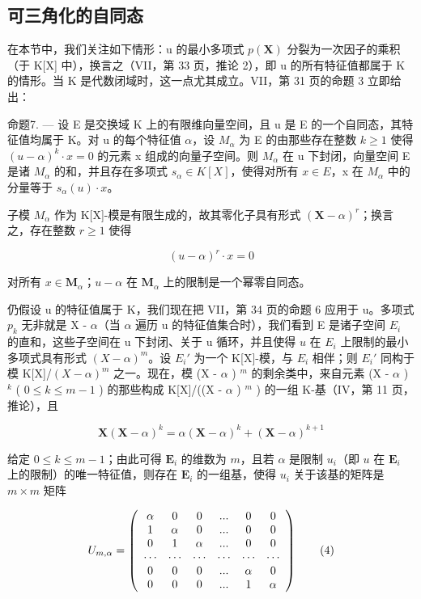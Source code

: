 \subsection{可三角化的自同态}

在本节中，我们关注如下情形：u 的最小多项式 \(p(\mathbf{X})\) 分裂为一次因子的乘积（于 K{[}X{]} 中），换言之（VII，第 33 页，推论 2），即 u 的所有特征值都属于 K 的情形。当 K 是代数闭域时，这一点尤其成立。VII，第 31 页的命题 3 立即给出：

命题7. --- 设 E 是交换域 K 上的有限维向量空间，且 u 是 E 的一个自同态，其特征值均属于 K。对 u 的每个特征值 \(\alpha\)，设 \(M_{\alpha}\) 为 E 的由那些存在整数 \(k \geqslant 1\) 使得 \((u - \alpha)^{k} \cdot x = 0\) 的元素 x 组成的向量子空间。则 \(M_{\alpha}\) 在 u 下封闭，向量空间 E 是诸 \(M_{\alpha}\) 的和，并且存在多项式 \(s_{\alpha} \in K[X]\)，使得对所有 \(x \in E\)，x 在 \(M_{\alpha}\) 中的分量等于 \(s_{\alpha}(u) \cdot x\)。

子模 \(M_{\alpha}\) 作为 K{[}X{]}-模是有限生成的，故其零化子具有形式 \((\mathbf{X}-\alpha)^{r}\)；换言之，存在整数 \(r \geqslant 1\) 使得

\[
(u - \alpha) ^ {r} \cdot x = 0
\]

对所有 \(x \in \mathbf{M}_{\alpha}\)；\(u - \alpha\) 在 \(\mathbf{M}_{\alpha}\) 上的限制是一个幂零自同态。

仍假设 u 的特征值属于 K，我们现在把 VII，第 34 页的命题 6 应用于 u。多项式 \(p_{k}\) 无非就是 X - \(\alpha\)（当 \(\alpha\) 遍历 u 的特征值集合时），我们看到 E 是诸子空间 \(E_{i}\) 的直和，这些子空间在 u 下封闭、关于 u 循环，并且使得 \(u\) 在 \(E_i\) 上限制的最小多项式具有形式 \((X - \alpha)^m\)。设 \(E_i'\) 为一个 K{[}X{]}-模，与 \(E_i\) 相伴；则 \(E_i'\) 同构于模 K{[}X{]}/\((X - \alpha)^{m}\) 之一。现在，模 (X - \(\alpha\) ) \(^m\) 的剩余类中，来自元素 (X - \(\alpha\) ) \(^k\) ( \(0 \leqslant k \leqslant m - 1\) ) 的那些构成 K{[}X{]}/((X - \(\alpha\) ) \(^m\) ) 的一组 K-基（IV，第 11 页，推论），且

\[
\mathbf {X} (\mathbf {X} - \alpha) ^ {k} = \alpha (\mathbf {X} - \alpha) ^ {k} + (\mathbf {X} - \alpha) ^ {k + 1}
\]

给定 \(0 \leqslant k \leqslant m - 1\)；由此可得 \(\mathbf{E}_i\) 的维数为 \(m\)，且若 \(\alpha\) 是限制 \(u_i\)（即 \(u\) 在 \(\mathbf{E}_i\) 上的限制）的唯一特征值，则存在 \(\mathbf{E}_i\) 的一组基，使得 \(u_i\) 关于该基的矩阵是 \(m \times m\) 矩阵

\[
U _ {m, \alpha} = \left( \begin{array}{c c c c c c} \alpha & 0 & 0 & ... & 0 & 0 \\ 1 & \alpha & 0 & ... & 0 & 0 \\ 0 & 1 & \alpha & ... & 0 & 0 \\ \cdots & \cdots & \cdots & \cdots & \cdots & \cdots \\ 0 & 0 & 0 & ... & \alpha & 0 \\ 0 & 0 & 0 & ... & 1 & \alpha \end{array} \right)\tag{4}
\]

